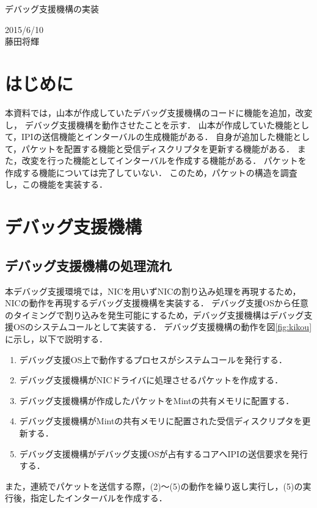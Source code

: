 \documentclass[12pt]{jsarticle}
\begin{document}

\begin{center}
    {\LARGE デバッグ支援機構の実装}
\end{center}

\begin{flushright}
  2015/6/10\\
  藤田将輝
\end{flushright}
\section{はじめに}
本資料では，山本が作成していたデバッグ支援機構のコードに機能を追加，改変し，
デバッグ支援機構を動作させたことを示す．
山本が作成していた機能として，IPIの送信機能とインターバルの生成機能がある．
自身が追加した機能として，パケットを配置する機能と受信ディスクリプタを更新する機能がある．
また，改変を行った機能としてインターバルを作成する機能がある．
パケットを作成する機能については完了していない．
このため，パケットの構造を調査し，この機能を実装する．

\section{デバッグ支援機構}
\subsection{デバッグ支援機構の処理流れ}
本デバッグ支援環境では，NICを用いずNICの割り込み処理を再現するため，NICの動作を再現するデバッグ支援機構を実装する．
デバッグ支援OSから任意のタイミングで割り込みを発生可能にするため，デバッグ支援機構はデバッグ支援OSのシステムコールとして実装する．
デバッグ支援機構の動作を図\ref{fig:kikou}に示し，以下で説明する．
\begin{enumerate}
    \item デバッグ支援OS上で動作するプロセスがシステムコールを発行する．
    \item デバッグ支援機構がNICドライバに処理させるパケットを作成する．
    \item デバッグ支援機構が作成したパケットをMintの共有メモリに配置する．
    \item デバッグ支援機構がMintの共有メモリに配置された受信ディスクリプタを更新する．
    \item デバッグ支援機構がデバッグ支援OSが占有するコアへIPIの送信要求を発行する．
\end{enumerate}
また，連続でパケットを送信する際，(2)〜(5)の動作を繰り返し実行し，(5)の実行後，指定したインターバルを作成する．
\end{document}
